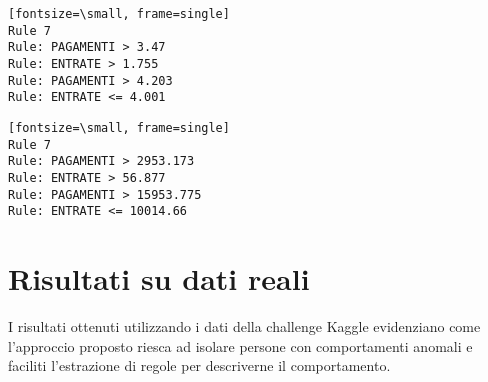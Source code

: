\begin{minipage}{7cm}
\raggedright
\begin{Verbatim}[t][fontsize=\small, frame=single]
Rule 7
Rule: PAGAMENTI > 3.47
Rule: ENTRATE > 1.755
Rule: PAGAMENTI > 4.203
Rule: ENTRATE <= 4.001
\end{Verbatim}
\end{minipage}%
\begin{minipage}{6cm}
\raggedleft
\begin{Verbatim}[t][fontsize=\small, frame=single]
Rule 7
Rule: PAGAMENTI > 2953.173
Rule: ENTRATE > 56.877
Rule: PAGAMENTI > 15953.775
Rule: ENTRATE <= 10014.66
\end{Verbatim}
\end{minipage}




\section{Risultati su dati reali}

I risultati ottenuti utilizzando i dati della challenge Kaggle evidenziano come l'approccio proposto riesca ad isolare persone con comportamenti anomali e faciliti l'estrazione  di regole per descriverne il comportamento.

